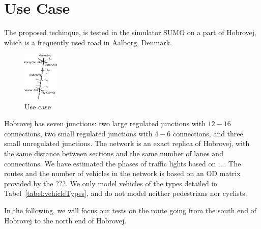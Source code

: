 \section{Use Case}\label{sec:UseCase}
The proposed techinque, \tech is tested in the simulator SUMO on a part of Hobrovej, which is a frequently used road in Aalborg, Denmark.

\begin{figure}[htb]
\centering
\includegraphics[width=0.15\textwidth]{../images/Hobrovej.png}
\caption{Use case}
\label{fig:Introduction:hobro}
\end{figure}

Hobrovej has seven junctions: two large regulated junctions with $12-16$ connections, two small regulated junctions with $4-6$ connections, and three small unregulated junctions.
The network is an exact replica of Hobrovej, with the same distance between sections and the same number of lanes and connections. 
We have estimated the phases of traffic lights based on ....%
The routes and the number of vehicles in the network is based on an OD matrix provided by the ???.
We only model vehicles of the types detailed in Tabel~\ref{tabel:vehicleTypes}, and do not model neither pedestrians nor cyclists.

In the following, we will focus our tests on the route going from the south end of Hobrovej to the north end of Hobrovej. 